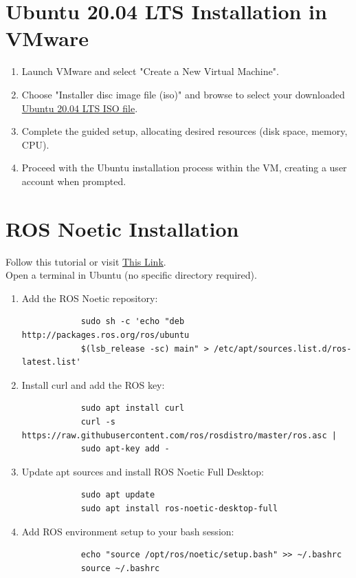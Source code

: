 \documentclass[12pt,a4paper]{article}
\begin{document}
	\section{Ubuntu 20.04 LTS Installation in VMware}
	\begin{enumerate}
		\item Launch VMware and select "Create a New Virtual Machine".
		\item Choose "Installer disc image file (iso)" and browse to select your downloaded \href{https://releases.ubuntu.com/focal/}{Ubuntu 20.04 LTS ISO file}.
		\item Complete the guided setup, allocating desired resources (disk space, memory, CPU).
		\item Proceed with the Ubuntu installation process within the VM, creating a user account when prompted.
	\end{enumerate}
	
	\section{ROS Noetic Installation}
	Follow this tutorial or visit \href{https://wiki.ros.org/noetic/Installation/Ubuntu}{This Link}.\\
	Open a terminal in Ubuntu (no specific directory required).
	\begin{enumerate}
		\item Add the ROS Noetic repository:
		\begin{verbatim}
			sudo sh -c 'echo "deb http://packages.ros.org/ros/ubuntu 
			$(lsb_release -sc) main" > /etc/apt/sources.list.d/ros-latest.list'
		\end{verbatim}
		
		\item Install curl and add the ROS key:
		\begin{verbatim}
			sudo apt install curl
			curl -s https://raw.githubusercontent.com/ros/rosdistro/master/ros.asc | 
			sudo apt-key add -
		\end{verbatim}
		
		\item Update apt sources and install ROS Noetic Full Desktop:
		\begin{verbatim}
			sudo apt update
			sudo apt install ros-noetic-desktop-full
		\end{verbatim}
		
		\item Add ROS environment setup to your bash session:
		\begin{verbatim}
			echo "source /opt/ros/noetic/setup.bash" >> ~/.bashrc
			source ~/.bashrc
		\end{verbatim}
	\end{enumerate}
	
\end{document}
